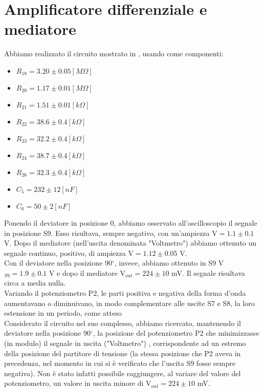 \section{Amplificatore differenziale e mediatore}
Abbiamo realizzato il circuito mostrato in , usando come componenti:
\begin{itemize}
\item $R_{18}=3.20 \pm 0.05[M\Omega]$
\item $R_{20}=1.17 \pm 0.01[M\Omega]$
\item $R_{21}=1.51 \pm 0.01[k\Omega]$
\item $R_{22}=38.6 \pm 0.4[k\Omega]$
\item $R_{23}=32.2 \pm 0.4[k\Omega]$
\item $R_{24}=38.7 \pm 0.4[k\Omega]$
\item $R_{26}=32.3 \pm 0.4[k\Omega]$
\item $C_5=232 \pm 12[nF]$
\item $C_6=50 \pm 2[nF]$
\end{itemize}
Ponendo il deviatore in posizione 0, abbiamo osservato all'oscilloscopio il segnale in posizione S9. Esso risultava, sempre negativo, con un'ampiezza V$ = 1.1 \pm 0.1$ V. Dopo il mediatore (nell'uscita denominata "Voltmetro") abbiamo ottenuto un segnale continuo, positivo, di ampiezza V$ = 1.12 \pm 0.05$ V.\\
Con il deviatore nella posizione 90$^\circ$, invece, abbiamo ottenuto in S9 V$_{S9} = 1.9 \pm 0.1$ V e dopo il mediatore V$_{out} = 224 \pm 10$ mV. Il segnale risultava circa a media nulla.\\
 Variando il potenziometro P2, le parti positiva e negativa della forma d'onda aumentavano o diminuivano, in modo complementare alle uscite S7 e S8, la loro estensione in un periodo, come atteso\\
Considerato il circuito nel suo complesso, abbiamo ricercato, mantenendo il deviatore nella posizione 90$^\circ$, la posizione del potenziometro P2 che minimizzasse (in modulo) il segnale in uscita ("Voltmetro") , corrispondente ad un estremo della posizione del partitore di tensione (la stessa posizione che P2 aveva in precedenza, nel momento in cui si è verificato che l'uscita S9 fosse sempre negativa). Non è stato infatti possibile raggiungere, al variare del valore del potenziometro, un valore in uscita minore di V$_{out} = 224 \pm 10$ mV. 

